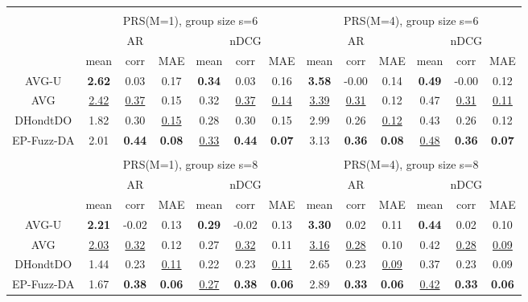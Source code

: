 \begin{tabular}{ c | c c c | c c c || c c c | c c c}
\multicolumn{12}{c}{} \\
\multicolumn{1}{c}{} & \multicolumn{6}{c}{PRS(M=1), group size s=6} & \multicolumn{6}{c}{PRS(M=4), group size s=6} \\
\multicolumn{1}{c}{} & \multicolumn{3}{c}{AR} & \multicolumn{3}{c}{nDCG} & \multicolumn{3}{c}{AR} & \multicolumn{3}{c}{nDCG} \\
& mean & corr & MAE & mean & corr & MAE & mean & corr & MAE & mean & corr & MAE \\
\hline
AVG-U & \textbf{2.62} & 0.03 & 0.17 & \textbf{0.34} & 0.03 & 0.16 & \textbf{3.58} & -0.00 & 0.14 & \textbf{0.49} & -0.00 & 0.12 \\
AVG & \underline{2.42} & \underline{0.37} & 0.15 & 0.32 & \underline{0.37} & \underline{0.14} & \underline{3.39} & \underline{0.31} & 0.12 & 0.47 & \underline{0.31} & \underline{0.11} \\
DHondtDO & 1.82 & 0.30 & \underline{0.15} & 0.28 & 0.30 & 0.15 & 2.99 & 0.26 & \underline{0.12} & 0.43 & 0.26 & 0.12 \\
EP-Fuzz-DA & 2.01 & \textbf{0.44} & \textbf{0.08} & \underline{0.33} & \textbf{0.44} & \textbf{0.07} & 3.13 & \textbf{0.36} & \textbf{0.08} & \underline{0.48} & \textbf{0.36} & \textbf{0.07} \\

\multicolumn{12}{c}{} \\
\multicolumn{1}{c}{} & \multicolumn{6}{c}{PRS(M=1), group size s=8} & \multicolumn{6}{c}{PRS(M=4), group size s=8} \\
\multicolumn{1}{c}{} & \multicolumn{3}{c}{AR} & \multicolumn{3}{c}{nDCG} & \multicolumn{3}{c}{AR} & \multicolumn{3}{c}{nDCG} \\
& mean & corr & MAE & mean & corr & MAE & mean & corr & MAE & mean & corr & MAE \\
\hline
AVG-U & \textbf{2.21} & -0.02 & 0.13 & \textbf{0.29} & -0.02 & 0.13 & \textbf{3.30} & 0.02 & 0.11 & \textbf{0.44} & 0.02 & 0.10 \\
AVG & \underline{2.03} & \underline{0.32} & 0.12 & 0.27 & \underline{0.32} & 0.11 & \underline{3.16} & \underline{0.28} & 0.10 & 0.42 & \underline{0.28} & \underline{0.09} \\
DHondtDO & 1.44 & 0.23 & \underline{0.11} & 0.22 & 0.23 & \underline{0.11} & 2.65 & 0.23 & \underline{0.09} & 0.37 & 0.23 & 0.09 \\
EP-Fuzz-DA & 1.67 & \textbf{0.38} & \textbf{0.06} & \underline{0.27} & \textbf{0.38} & \textbf{0.06} & 2.89 & \textbf{0.33} & \textbf{0.06} & \underline{0.42} & \textbf{0.33} & \textbf{0.06} \\

\end{tabular}
